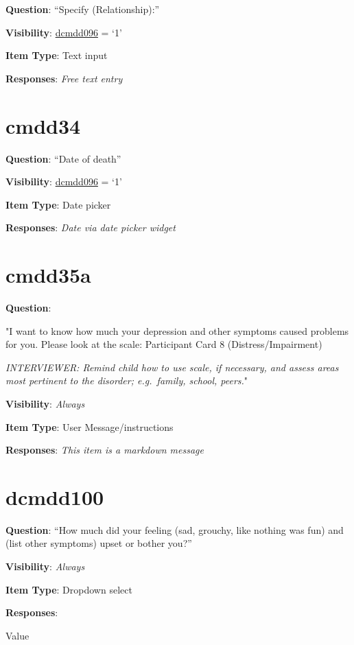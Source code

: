 \documentclass[]{book}
\begin{document}
\textbf{Question}: ``Specify (Relationship):''

\textbf{Visibility}: \protect\hyperlink{dcmdd096}{dcmdd096} = `1'

\textbf{Item Type}: Text input

\textbf{Responses}: \emph{Free text entry}

\hypertarget{cmdd34}{%
\section{cmdd34}\label{cmdd34}}

\textbf{Question}: ``Date of death''

\textbf{Visibility}: \protect\hyperlink{dcmdd096}{dcmdd096} = `1'

\textbf{Item Type}: Date picker

\textbf{Responses}: \emph{Date via date picker widget}

\hypertarget{cmdd35a}{%
\section{cmdd35a}\label{cmdd35a}}

\textbf{Question}:

"I want to know how much your depression and other symptoms caused problems for you. Please look at the scale: Participant Card 8 (Distress/Impairment)

\emph{INTERVIEWER: Remind child how to use scale, if necessary, and assess areas most pertinent to the disorder; e.g.~family, school, peers.}"

\textbf{Visibility}: \emph{Always}

\textbf{Item Type}: User Message/instructions

\textbf{Responses}: \emph{This item is a markdown message}

\hypertarget{dcmdd100}{%
\section{dcmdd100}\label{dcmdd100}}

\textbf{Question}: ``How much did your feeling (sad, grouchy, like nothing was fun) and (list other symptoms) upset or bother you?''

\textbf{Visibility}: \emph{Always}

\textbf{Item Type}: Dropdown select

\textbf{Responses}:

Value
\end{document}
